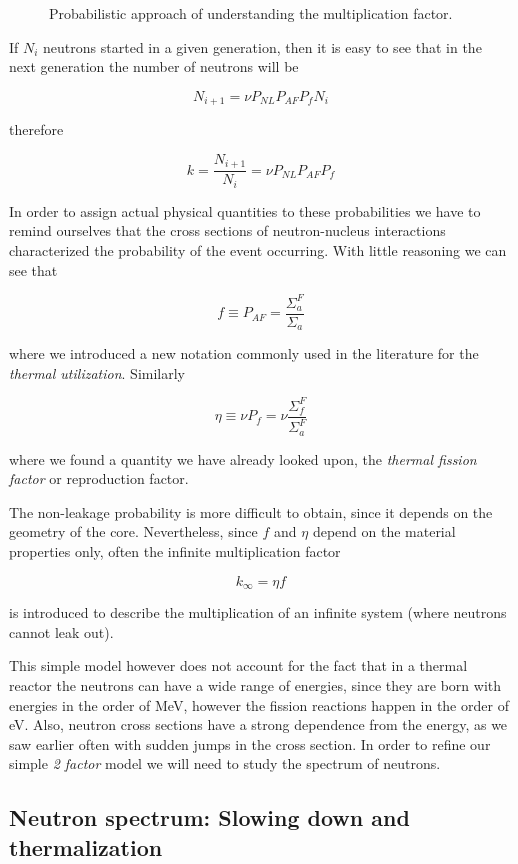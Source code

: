 \begin{figure}[ht!]
\protect {}\protect
\caption{\label{fig:2factors} \footnotesize{Probabilistic approach of understanding the multiplication factor.}}
\end{figure}

If $N_i$ neutrons started in a given generation, then it is easy to see that in the next generation the number of neutrons will be

$$N_{i+1}=\nu P_{NL}P_{AF}P_{f}N_i$$

therefore

$$k=\frac{N_{i+1}}{N_i}=\nu P_{NL}P_{AF}P_{f}$$

In order to assign actual physical quantities to these probabilities we have to remind ourselves that the cross sections of neutron-nucleus interactions characterized the probability of the event occurring. With little reasoning we can see that

$$f\equiv P_{AF} = \frac{\Sigma_a^F}{\Sigma_a}$$

\noindent where we introduced a new notation commonly used in the literature for the \textit{thermal utilization}. Similarly 

$$\eta \equiv \nu P_f= \nu\frac{\Sigma_f^F}{\Sigma_a^F}$$

\noindent where we found a quantity we have already looked upon, the \textit{thermal fission factor} or reproduction factor.

The non-leakage probability is more difficult to obtain, since it depends on the geometry of the core. Nevertheless, since $f$ and $\eta$ depend on the material properties only, often the infinite multiplication factor 

$$k_\infty=\eta f$$

is introduced to describe the multiplication of an infinite system (where neutrons cannot leak out). 

This simple model however does not account for the fact that in a thermal reactor the neutrons can have a wide range of energies, since they are born with energies in the order of MeV, however the fission reactions happen in the order of eV. Also, neutron cross sections have a strong dependence from the energy, as we saw earlier often with sudden jumps in the cross section. In order to refine our simple \textit{2 factor} model we will need to study the spectrum of neutrons.

\subsection{Neutron spectrum: Slowing down and thermalization}

